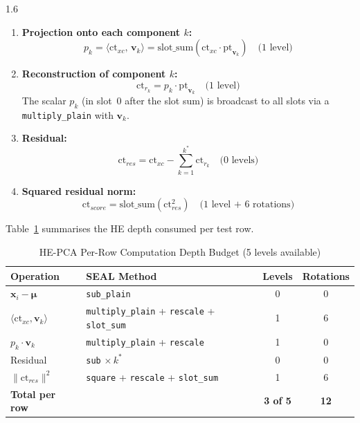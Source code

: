 \begin{spacing}{1.6}
\begin{enumerate}
  \item \textbf{Projection onto each component $k$:}
  \begin{equation}
    p_k = \langle \mathrm{ct}_{xc},\,\mathbf{v}_k \rangle
        = \mathrm{slot\_sum}\!\left(
            \mathrm{ct}_{xc} \cdot \mathrm{pt}_{\mathbf{v}_k}
          \right)
    \quad\text{(1 level)}
  \end{equation}

  \item \textbf{Reconstruction of component $k$:}
  \begin{equation}
    \mathrm{ct}_{r_k} = p_k \cdot \mathrm{pt}_{\mathbf{v}_k}
    \quad\text{(1 level)}
  \end{equation}
  The scalar $p_k$ (in slot~0 after the slot sum) is broadcast to all
  slots via a \texttt{multiply\_plain} with $\mathbf{v}_k$.

  \item \textbf{Residual:}
  \begin{equation}
    \mathrm{ct}_{res} = \mathrm{ct}_{xc}
      - \sum_{k=1}^{k^*} \mathrm{ct}_{r_k}
    \quad\text{(0 levels)}
  \end{equation}

  \item \textbf{Squared residual norm:}
  \begin{equation}
    \mathrm{ct}_{score} =
      \mathrm{slot\_sum}\!\left(\mathrm{ct}_{res}^2\right)
    \quad\text{(1 level + 6 rotations)}
  \end{equation}
\end{enumerate}

Table~\ref{tab:pca_depth} summarises the HE depth consumed per test row.

\end{spacing}

\begin{table}[!ht]
\centering
\caption{HE-PCA Per-Row Computation Depth Budget (5 levels available)}
\label{tab:pca_depth}
\begin{tabular}{p{4cm}p{5cm}cc}
\toprule
\textbf{Operation} & \textbf{SEAL Method} & \textbf{Levels} & \textbf{Rotations} \\
\midrule
$\mathbf{x}_i - \boldsymbol{\mu}$ &
  \texttt{sub\_plain} & 0 & 0 \\
$\langle\mathrm{ct}_{xc},\mathbf{v}_k\rangle$ &
  \texttt{multiply\_plain} + \texttt{rescale} + \texttt{slot\_sum} & 1 & 6 \\
$p_k \cdot \mathbf{v}_k$ &
  \texttt{multiply\_plain} + \texttt{rescale} & 1 & 0 \\
Residual &
  \texttt{sub} $\times\,k^*$ & 0 & 0 \\
$\|\mathrm{ct}_{res}\|^2$ &
  \texttt{square} + \texttt{rescale} + \texttt{slot\_sum} & 1 & 6 \\
\midrule
\textbf{Total per row} & & \textbf{3 of 5} & \textbf{12} \\
\bottomrule
\end{tabular}
\end{table}

